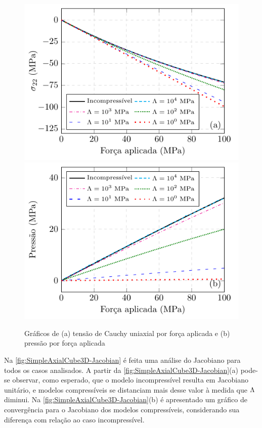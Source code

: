 \documentclass[Tese.tex]{subfiles}
\begin{document}
\begin{figure}[!h]
	\centering
	\caption{Gráficos de (a) tensão de Cauchy uniaxial por força aplicada e (b) pressão por força aplicada}
	\label{fig:SimpleAxialCube3D-Stress}
	\includegraphics[scale=0.95]{Figuras/SimpleAxialCube3D/SimpleAxialCube3D-CauchyStress.pdf}\;\;\includegraphics[scale=0.95]{Figuras/SimpleAxialCube3D/SimpleAxialCube3D-Pressure.pdf}
\end{figure}

Na \autoref{fig:SimpleAxialCube3D-Jacobian} é feita uma análise do Jacobiano para todos os casos analisados. A partir da \autoref{fig:SimpleAxialCube3D-Jacobian}(a) pode-se observar, como esperado, que o modelo incompressível resulta em Jacobiano unitário, e modelos compressíveis se distanciam mais desse valor à medida que $\Lambda$ diminui. Na \autoref{fig:SimpleAxialCube3D-Jacobian}(b) é apresentado um gráfico de convergência para o Jacobiano dos modelos compressíveis, considerando sua diferença com relação ao caso incompressível.
\end{document}
